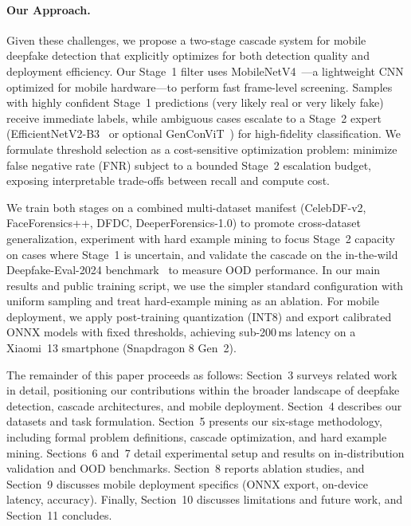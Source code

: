 \paragraph{Our Approach.}
Given these challenges, we propose a two\hyp stage cascade system for mobile deepfake detection that explicitly optimizes for both detection quality and deployment efficiency. Our Stage~1 filter uses MobileNetV4~\cite{mobilenetv4}—a lightweight CNN optimized for mobile hardware—to perform fast frame\hyp level screening. Samples with highly confident Stage~1 predictions (very likely real or very likely fake) receive immediate labels, while ambiguous cases escalate to a Stage~2 expert (EfficientNetV2\hyp B3~\cite{efficientnetv2} or optional GenConViT~\cite{genconvit_github}) for high\hyp fidelity classification. We formulate threshold selection as a cost\hyp sensitive optimization problem: minimize false negative rate (FNR) subject to a bounded Stage~2 escalation budget, exposing interpretable trade\hyp offs between recall and compute cost.

We train both stages on a combined multi\hyp dataset manifest (CelebDF\hyp v2, FaceForensics++, DFDC, DeeperForensics\hyp 1.0) to promote cross\hyp dataset generalization, experiment with hard example mining to focus Stage~2 capacity on cases where Stage~1 is uncertain, and validate the cascade on the in\hyp the\hyp wild Deepfake\hyp Eval\hyp 2024 benchmark~\cite{deepeval2024} to measure OOD performance. In our main results and public training script, we use the simpler standard configuration with uniform sampling and treat hard\hyp example mining as an ablation. For mobile deployment, we apply post\hyp training quantization (INT8) and export calibrated ONNX models with fixed thresholds, achieving sub\hyp 200\,ms latency on a Xiaomi~13 smartphone (Snapdragon 8 Gen~2).

The remainder of this paper proceeds as follows: Section~3 surveys related work in detail, positioning our contributions within the broader landscape of deepfake detection, cascade architectures, and mobile deployment. Section~4 describes our datasets and task formulation. Section~5 presents our six\hyp stage methodology, including formal problem definitions, cascade optimization, and hard example mining. Sections~6 and~7 detail experimental setup and results on in\hyp distribution validation and OOD benchmarks. Section~8 reports ablation studies, and Section~9 discusses mobile deployment specifics (ONNX export, on\hyp device latency, accuracy). Finally, Section~10 discusses limitations and future work, and Section~11 concludes.
